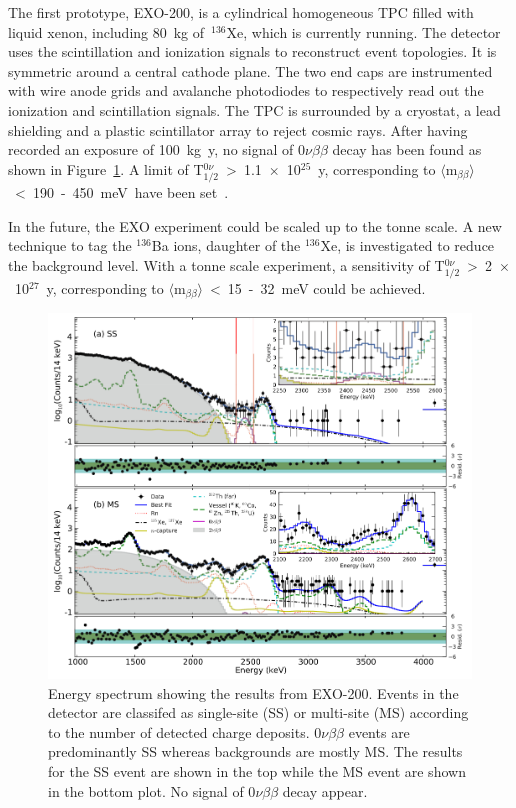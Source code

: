 \documentclass[main.tex]{subfiles}
\begin{document}
\bigskip


\NI The first prototype, EXO-200, is a cylindrical homogeneous TPC filled with liquid xenon, including 80~kg of~$^{\text{136}}$Xe, which is currently running. The detector uses the scintillation and ionization signals to reconstruct event topologies. It is symmetric around a central cathode plane. The two end caps are instrumented with wire anode grids and avalanche photodiodes to respectively read out the ionization and scintillation signals. The TPC is surrounded by a cryostat, a lead shielding and a plastic scintillator array to reject cosmic rays. After having recorded an exposure of 100~kg~y, no signal of 0$\nu\beta\beta$ decay has been found as shown in Figure~\ref{EXO200results}. A limit of T$_{\text{1/2}}^{0\nu}$~>~1.1~$\times$~10$^{\text{25}}$~y, corresponding to $\langle \text{m}_{\beta\beta} \rangle$~<~190~-~450~meV~have been set~\cite{EXO-200}. 


\bigskip


\NI In the future, the EXO experiment could be scaled up to the tonne scale. A new technique to tag the $^{\text{136}}$Ba ions, daughter of the $^{\text{136}}$Xe, is investigated to reduce the background level. With a tonne scale experiment, a sensitivity of T$_{\text{1/2}}^{0\nu}$~>~2~$\times$~10$^{\text{27}}$~y, corresponding to $\langle \text{m}_{\beta\beta} \rangle$~<~15~-~32~meV could be achieved.


\begin{figure}[h!]
\begin{center}
\includegraphics[scale=0.4]{pictures/Chap2/EXO-200-experiment.png}
\caption{Energy spectrum showing the results from EXO-200. Events in the detector are classifed as single-site (SS) or multi-site (MS) according to the number of detected charge deposits. 0$\nu\beta\beta$ events are predominantly SS whereas backgrounds are mostly MS. The results for the SS event are shown in the top while the MS event are shown in the bottom plot. No signal of 0$\nu\beta\beta$ decay appear.}
\label{EXO200results}
\end{center}
\end{figure}
\end{document}
